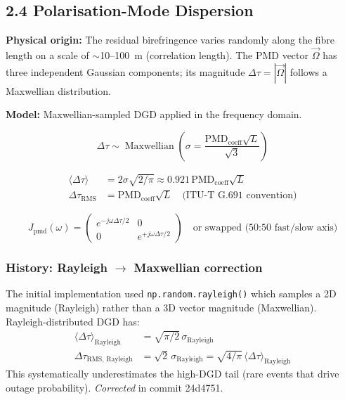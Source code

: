\documentclass[11pt,a4paper]{article}
\begin{document}
\subsection{2.4 Polarisation-Mode Dispersion}
\label{sec:pmd}

\textbf{Physical origin:} The residual birefringence varies randomly along
the fibre length on a scale of $\sim$10--100~m (correlation length).
The PMD vector $\vec{\Omega}$ has three independent Gaussian components;
its magnitude $\Delta\tau = |\vec{\Omega}|$ follows a Maxwellian
distribution.

\textbf{Model:} Maxwellian-sampled DGD applied in the frequency domain.

\begin{equation}
  \Delta\tau \sim \operatorname{Maxwellian}\!\left(\sigma =
    \frac{\text{PMD}_{\text{coeff}}\sqrt{L}}{\sqrt{3}}\right)
\end{equation}

\begin{align}
  \langle\Delta\tau\rangle &= 2\sigma\sqrt{2/\pi} \approx
    0.921\,\text{PMD}_{\text{coeff}}\sqrt{L} \\
  \Delta\tau_{\text{RMS}} &=
    \text{PMD}_{\text{coeff}}\sqrt{L} \quad\text{(ITU-T G.691 convention)}
\end{align}

\begin{equation}
  J_{\text{pmd}}(\omega) = \begin{pmatrix}
    e^{-j\omega\Delta\tau/2} & 0 \\
    0 & e^{+j\omega\Delta\tau/2}
  \end{pmatrix}
  \quad\text{or swapped (50:50 fast/slow axis)}
\end{equation}

\subsubsection*{History: Rayleigh $\rightarrow$ Maxwellian correction}
The initial implementation used \texttt{np.random.rayleigh()} which
samples a 2D magnitude (Rayleigh) rather than a 3D vector magnitude
(Maxwellian).  Rayleigh-distributed DGD has:
\begin{align}
  \langle\Delta\tau\rangle_{\text{Rayleigh}} &=
    \sqrt{\pi/2}\,\sigma_{\text{Rayleigh}} \\
  \Delta\tau_{\text{RMS, Rayleigh}} &=
    \sqrt{2}\,\sigma_{\text{Rayleigh}}
    = \sqrt{4/\pi}\,\langle\Delta\tau\rangle_{\text{Rayleigh}}
\end{align}
This systematically underestimates the high-DGD tail (rare events that
drive outage probability).  \emph{Corrected} in commit 24d4751.
\end{document}
